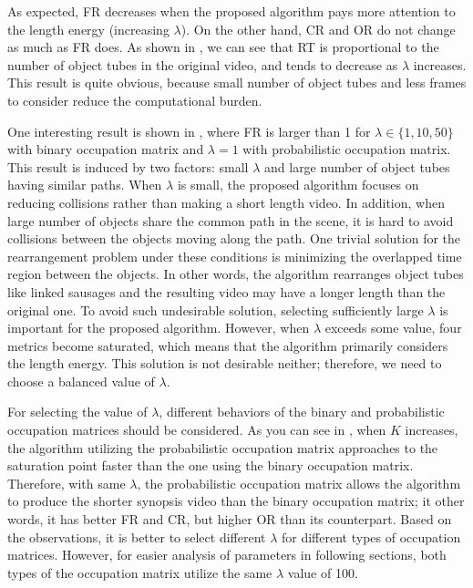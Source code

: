 \documentclass[11pt]{hyu_thesis}
\begin{document}
As expected, FR decreases when the proposed algorithm pays more attention to the length energy (increasing $\lambda$). On the other hand, CR and OR do not change as much as FR does. As shown in , we can see that RT is proportional to the number of object tubes in the original video, and tends to decrease as $\lambda$ increases. This result is quite obvious, because small number of object tubes and less frames to consider reduce the computational burden.

One interesting result is shown in , where FR is larger than 1 for $\lambda \in \{1, 10, 50\}$ with binary occupation matrix and $\lambda=1$ with probabilistic occupation matrix. This result is induced by two factors: small $\lambda$ and large number of object tubes having similar paths. When $\lambda$ is small, the proposed algorithm focuses on reducing collisions rather than making a short length video. In addition, when large number of objects share the common path in the scene, it is hard to avoid collisions between the objects moving along the path. One trivial solution for the rearrangement problem under these conditions is minimizing the overlapped time region between the objects. In other words, the algorithm rearranges object tubes like linked sausages and the resulting video may have a longer length than the original one. To avoid such undesirable solution, selecting sufficiently large $\lambda$ is important for the proposed algorithm. However, when $\lambda$ exceeds some value, four metrics become saturated, which means that the algorithm primarily considers the length energy. This solution is not desirable neither; therefore, we need to choose a balanced value of $\lambda$.

For selecting the value of $\lambda$, different behaviors of the binary and probabilistic occupation matrices should be considered. As you can see in , when $K$ increases, the algorithm utilizing the probabilistic occupation matrix approaches to the saturation point faster than the one using the binary occupation matrix. Therefore, with same $\lambda$, the probabilistic occupation matrix allows the algorithm to produce the shorter synopsis video than the binary occupation matrix; it other words, it has better FR and CR, but higher OR than its counterpart. Based on the observations, it is better to select different $\lambda$ for different types of occupation matrices. However, for easier analysis of parameters in following sections, both types of the occupation matrix utilize the same $\lambda$ value of 100.
\end{document}
